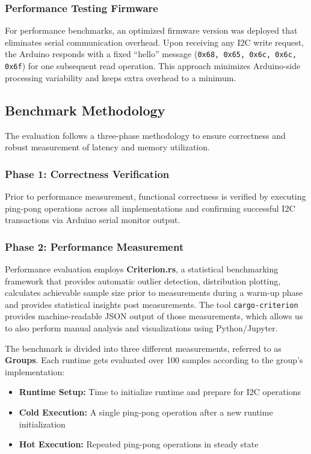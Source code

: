 \subsubsection{Performance Testing Firmware}
For performance benchmarks, an optimized firmware version was deployed that eliminates serial communication overhead. Upon receiving any I2C write request, the Arduino responds with a fixed ``hello'' message (\texttt{0x68, 0x65, 0x6c, 0x6c, 0x6f}) for one subsequent read operation. This approach minimizes Arduino-side processing variability and keeps extra overhead to a minimum.

\subsection{Benchmark Methodology}
\label{subsec:eval-setup-bench}

The evaluation follows a three-phase methodology to ensure correctness and robust measurement of latency and memory utilization.

\subsubsection{Phase 1: Correctness Verification}
Prior to performance measurement, functional correctness is verified by executing ping-pong operations across all implementations and confirming successful I2C transactions via Arduino serial monitor output.

\subsubsection{Phase 2: Performance Measurement}
Performance evaluation employs \textbf{Criterion.rs}, a statistical benchmarking framework that provides automatic outlier detection, distribution plotting, calculates achievable sample size prior to measurements during a warm-up phase and provides statistical insights post measurements\cite{criterion_rs}. The tool \texttt{cargo-criterion} provides machine-readable JSON output of those measurements, which allows us to also perform manual analysis and visualizations using Python/Jupyter.

The benchmark is divided into three different measurements, referred to as \textbf{Groups}. Each runtime gets evaluated over 100 samples according to the group's implementation:
\begin{itemize}
    \item \textbf{Runtime Setup:} Time to initialize runtime and prepare for I2C operations
    \item \textbf{Cold Execution:} A single ping-pong operation after a new runtime initialization
    \item \textbf{Hot Execution:} Repeated ping-pong operations in steady state
\end{itemize}

